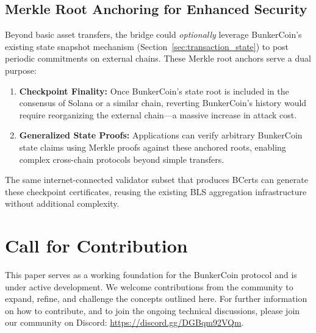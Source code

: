 \documentclass{article}
\begin{document}
\subsection{Merkle Root Anchoring for Enhanced Security}
Beyond basic asset transfers, the bridge could \emph{optionally} leverage BunkerCoin's existing state snapshot mechanism (Section~\ref{sec:transaction_state}) to post periodic commitments on external chains. These Merkle root anchors serve a dual purpose:

\begin{enumerate}
    \item \textbf{Checkpoint Finality:} Once BunkerCoin's state root is included in the consensus of Solana or a similar chain, reverting BunkerCoin's history would require reorganizing the external chain—a massive increase in attack cost.
    \item \textbf{Generalized State Proofs:} Applications can verify arbitrary BunkerCoin state claims using Merkle proofs against these anchored roots, enabling complex cross-chain protocols beyond simple transfers.
\end{enumerate}

The same internet-connected validator subset that produces BCerts can generate these checkpoint certificates, reusing the existing BLS aggregation infrastructure without additional complexity.
\section{Call for Contribution}

This paper serves as a working foundation for the BunkerCoin protocol and is under active development. We welcome contributions from the community to expand, refine, and challenge the concepts outlined here. For further information on how to contribute, and to join the ongoing technical discussions, please join our community on Discord: \url{https://discord.gg/DGBqm92VQm}.
\end{document}
